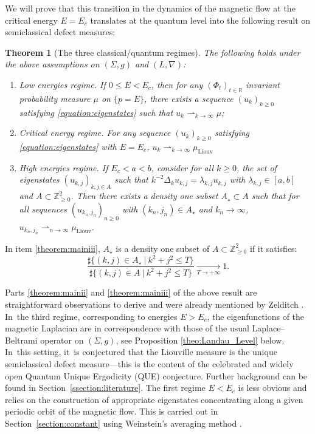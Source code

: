 \documentclass[JEP,XML,SOM,Unicode,published]{cedram}
\theoremstyle{plain}
\newtheorem{theorem}{Theorem}[section]
\theoremstyle{definition}
\newcommand{\R}{\mathbb{R}}
\newcommand{\Z}{\mathbb{Z}}
\begin{document}
We will prove that this transition in the dynamics of the magnetic flow at the critical energy $E=E_c$ translates at the quantum level into the following result on semiclassical defect measures:

\begin{theorem}[The three classical/quantum regimes]
\label{theorem:main}
The following holds under the above assumptions on $(\Sigma,g)$ and $(L,\nabla)$:
\begin{enumerate}

\item\label{theorem:maini} \emph{Low energies regime.} If $0 \leq E < E_c$, then for any $(\Phi_t)_{t \in \R}$ invariant probability measure $\mu$ on $\{p=E\}$, there exists a sequence $(u_{k})_{k \geq 0}$ satisfying \eqref{equation:eigenstates} such that $u_{k} \rightharpoonup_{k \to \infty} \mu$;

\item\label{theorem:mainii} \emph{Critical energy regime.} For any
sequence $(u_k)_{k \geq 0}$ satisfying \eqref{equation:eigenstates} with $E=E_c$, $u_{k} \rightharpoonup_{k \to \infty} \mu_{\mathrm{Liouv}}$

\item\label{theorem:mainiii} \emph{High energies regime.} If $E_c < a < b$, consider for
all $k \geq 0$, the set of eigenstates $(u_{k,j})_{k,j \in A}$ such that
$k^{-2} \Delta_k u_{k,j} = \lambda_{k,j} u_{k,j}$ with $\lambda_{k,j} \in
[a,b]$ and $A \subset \Z_{\geq 0}^2$. Then there exists a density one subset
$A_\star \subset A$ such that for all sequences $(u_{k_n,j_n})_{n \geq 0}$
with $(k_n,j_n) \in A_\star$ and $k_n \to \infty$, $u_{k_n,j_n} \rightharpoonup_{n \to \infty} \mu_{\mathrm{Liouv}}$.
\end{enumerate}
\end{theorem}

In item \eqref{theorem:mainiii}, $A_\star$ is a density one subset of $A \subset \Z^2_{\geq 0}$ if it satisfies:
\[
\dfrac{\sharp\{ (k,j) \in A_\star ~|~ k^2+j^2 \leq T\}}{\sharp\{ (k,j) \in A ~|~ k^2 + j^2 \leq T\}} \underset{T \to +\infty}\to 1.
\]

Parts \eqref{theorem:mainii} and \eqref{theorem:mainiii} of the above result are straightforward observations to
derive and were already mentioned by Zelditch \cite[p.\,20–21]{Zelditch-92}. In~the third regime, corresponding to energies $E > E_c$, the eigenfunctions
of the magnetic Laplacian are in correspondence with those of the usual
Laplace–Beltrami operator on $(\Sigma,g)$, see Proposition \ref{theo:Landau_Level} below. In~this setting, it~is conjectured that the
Liouville measure is the unique semiclassical defect measure—this is the
content of the celebrated and widely open Quantum Unique Ergodicity (QUE)
conjecture. Further background can be found in Section~\ref{ssection:literature}.
The first regime $E < E_c$ is less obvious and relies on the construction of
appropriate eigenstates concentrating along a given periodic orbit of the
magnetic flow. This is carried out in Section~\ref{section:constant} using
Weinstein's averaging method \cite{Weinstein-77}.
\end{document}
